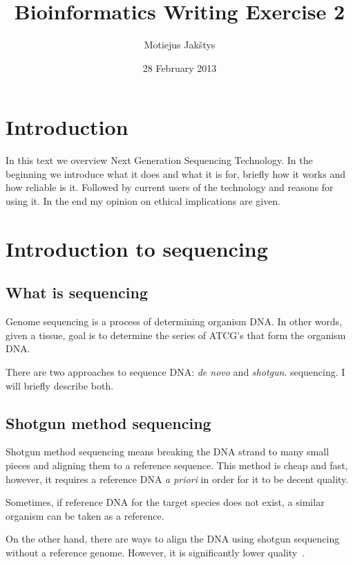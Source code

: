 \documentclass[english,11pt]{article}
\numberwithin{equation}{section}
\begin{document}
\title{Bioinformatics Writing Exercise 2}
\author{Motiejus Jakštys}
\date{28 February 2013}

\maketitle
\pagebreak
\tableofcontents
\pagebreak

\section{Introduction}

In this text we overview Next Generation Sequencing Technology. In the beginning
we introduce what it does and what it is for, briefly how it works and how
reliable is it. Followed by current users of the technology and reasons for
using it. In the end my opinion on ethical implications are given.

\section{Introduction to sequencing}

\subsection{What is sequencing}

Genome sequencing is a process of determining organism DNA. In other words,
given a tissue, goal is to determine the series of ATCG's that form the organism
DNA.

There are two approaches to sequence DNA: \emph{de novo} and \emph{shotgun}.
sequencing. I will briefly describe both.

\subsection{Shotgun method sequencing}

Shotgun method sequencing means breaking the DNA strand to many small pieces and
aligning them to a reference sequence. This method is cheap and fast, however,
it requires a reference DNA \emph{a priori} in order for it to be decent
quality.

Sometimes, if reference DNA for the target species does not exist, a similar
organism can be taken as a reference.

On the other hand, there are ways to align the DNA using shotgun sequencing
without a reference genome. However, it is significantly lower
quality~\cite{shotgun}.
\end{document}
